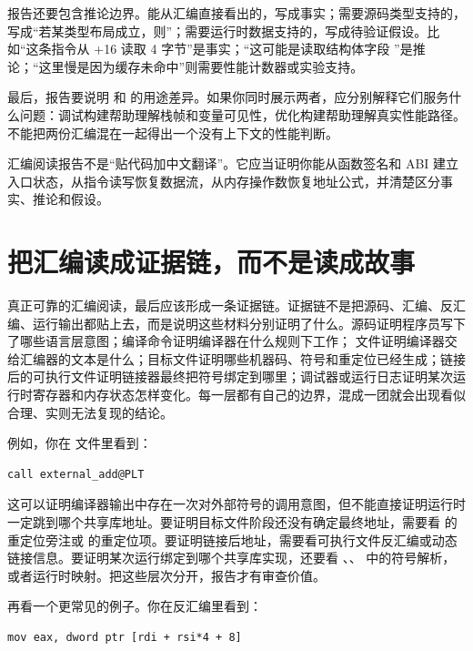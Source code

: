 报告还要包含推论边界。能从汇编直接看出的，写成事实；需要源码类型支持的，写成“若某类型布局成立，则”；需要运行时数据支持的，写成待验证假设。比如“这条指令从 +16 读取 4 字节”是事实；“这可能是读取结构体字段 ”是推论；“这里慢是因为缓存未命中”则需要性能计数器或实验支持。

最后，报告要说明  和  的用途差异。如果你同时展示两者，应分别解释它们服务什么问题：调试构建帮助理解栈帧和变量可见性，优化构建帮助理解真实性能路径。不能把两份汇编混在一起得出一个没有上下文的性能判断。

\begin{keyidea}
汇编阅读报告不是“贴代码加中文翻译”。它应当证明你能从函数签名和 ABI 建立入口状态，从指令读写恢复数据流，从内存操作数恢复地址公式，并清楚区分事实、推论和假设。
\end{keyidea}

\section{把汇编读成证据链，而不是读成故事}

真正可靠的汇编阅读，最后应该形成一条证据链。证据链不是把源码、汇编、反汇编、运行输出都贴上去，而是说明这些材料分别证明了什么。源码证明程序员写下了哪些语言层意图；编译命令证明编译器在什么规则下工作； 文件证明编译器交给汇编器的文本是什么；目标文件证明哪些机器码、符号和重定位已经生成；链接后的可执行文件证明链接器最终把符号绑定到哪里；调试器或运行日志证明某次运行时寄存器和内存状态怎样变化。每一层都有自己的边界，混成一团就会出现看似合理、实则无法复现的结论。

例如，你在  文件里看到：

\begin{lstlisting}
call external_add@PLT
\end{lstlisting}

这可以证明编译器输出中存在一次对外部符号的调用意图，但不能直接证明运行时一定跳到哪个共享库地址。要证明目标文件阶段还没有确定最终地址，需要看  的重定位旁注或  的重定位项。要证明链接后地址，需要看可执行文件反汇编或动态链接信息。要证明某次运行绑定到哪个共享库实现，还要看 、、 中的符号解析，或者运行时映射。把这些层次分开，报告才有审查价值。

再看一个更常见的例子。你在反汇编里看到：

\begin{lstlisting}
mov eax, dword ptr [rdi + rsi*4 + 8]
\end{lstlisting}

